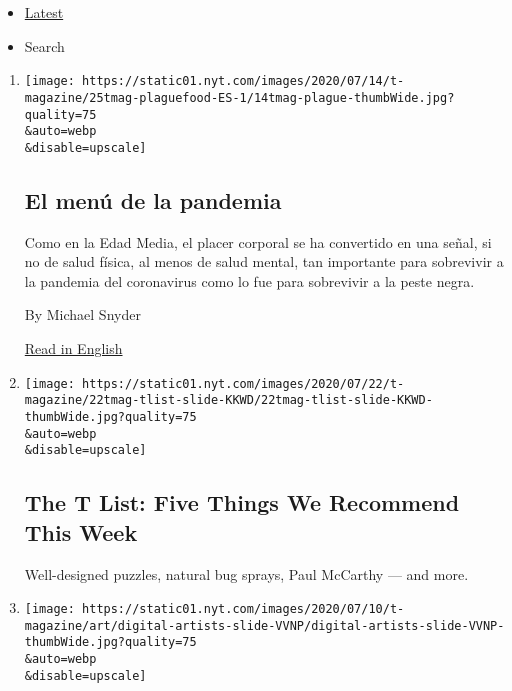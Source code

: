 \begin{itemize}
\tightlist
\item
  \protect\hyperlink{stream-panel}{Latest}
\item
  Search
\end{itemize}

\begin{enumerate}
\def\labelenumi{\arabic{enumi}.}
\item
  \href{/es/2020/07/23/t-magazine/comida-pandemia.html}{}

  \texttt{[image: https://static01.nyt.com/images/2020/07/14/t-magazine/25tmag-plaguefood-ES-1/14tmag-plague-thumbWide.jpg?quality=75\\\&auto=webp\\\&disable=upscale]}

  \hypertarget{el-menuxfa-de-la-pandemia}{%
  \subsection{El menú de la pandemia}\label{el-menuxfa-de-la-pandemia}}

  Como en la Edad Media, el placer corporal se ha convertido en una
  señal, si no de salud física, al menos de salud mental, tan importante
  para sobrevivir a la pandemia del coronavirus como lo fue para
  sobrevivir a la peste negra.

  By Michael Snyder

  \href{https://www.nytimes.com/2020/07/16/t-magazine/eating-food-during-plague.html}{Read
  in English}
\item
  \href{/2020/07/23/t-magazine/puzzles-bug-spray-tlist.html}{}

  \texttt{[image: https://static01.nyt.com/images/2020/07/22/t-magazine/22tmag-tlist-slide-KKWD/22tmag-tlist-slide-KKWD-thumbWide.jpg?quality=75\\\&auto=webp\\\&disable=upscale]}

  \hypertarget{the-t-list-five-things-we-recommend-this-week-2}{%
  \subsection{The T List: Five Things We Recommend This
  Week}\label{the-t-list-five-things-we-recommend-this-week-2}}

  Well-designed puzzles, natural bug sprays, Paul McCarthy --- and more.
\item
  \href{/2020/07/22/t-magazine/video-art.html}{}

  \texttt{[image: https://static01.nyt.com/images/2020/07/10/t-magazine/art/digital-artists-slide-VVNP/digital-artists-slide-VVNP-thumbWide.jpg?quality=75\\\&auto=webp\\\&disable=upscale]}


\end{enumerate}
